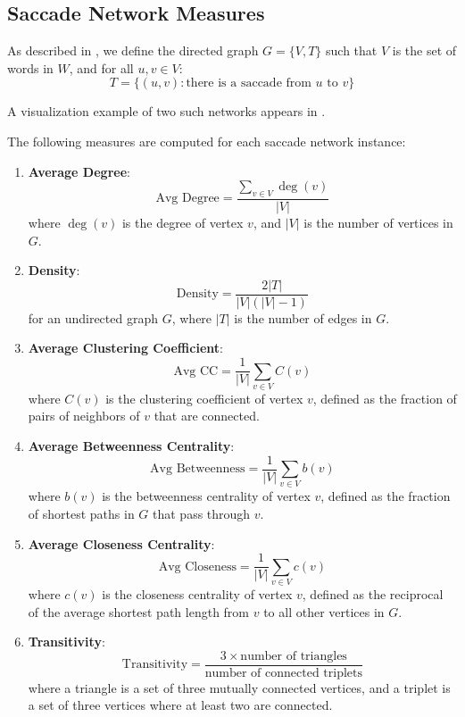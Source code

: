 \subsection{Saccade Network Measures}
\label{app:network_measures}


As described in , we define the directed graph $G=\{V,T\}$ such that $V$ is the set of words in $W$, and for all $u,v\in V$:
 $$T=\{\left(u,v\right): \text{there is a saccade from }u \text{ to }v\}$$ 

A visualization example of two such networks appears in .
 
 The following measures are computed for each saccade network instance:
\begin{enumerate}
    \item \textbf{Average Degree}:
    \[
    \text{Avg Degree} = \frac{\sum_{v \in V} \deg(v)}{|V|}
    \]
    where \( \deg(v) \) is the degree of vertex \( v \), and \( |V| \) is the number of vertices in \( G \).

    \item \textbf{Density}:
    \[
    \text{Density} = \frac{2|T|}{|V|(|V| - 1)}
    \]
    for an undirected graph \( G \), where \( |T| \) is the number of edges in \( G \).

    \item \textbf{Average Clustering Coefficient}:
    \[
    \text{Avg CC} = \frac{1}{|V|} \sum_{v \in V} C(v)
    \]
    where \( C(v) \) is the clustering coefficient of vertex \( v \), defined as the fraction of pairs of neighbors of \( v \) that are connected.

    \item \textbf{Average Betweenness Centrality}:
    \[
    \text{Avg Betweenness} = \frac{1}{|V|} \sum_{v \in V} b(v)
    \]
    where \( b(v) \) is the betweenness centrality of vertex \( v \), defined as the fraction of shortest paths in \( G \) that pass through \( v \).

    \item \textbf{Average Closeness Centrality}:
    \[
    \text{Avg Closeness} = \frac{1}{|V|} \sum_{v \in V} c(v)
    \]
    where \( c(v) \) is the closeness centrality of vertex \( v \), defined as the reciprocal of the average shortest path length from \( v \) to all other vertices in \( G \).

    \item \textbf{Transitivity}:
    \[
    \text{Transitivity} = \frac{3 \times \text{number of triangles}}{\text{number of connected triplets}}
    \]
    where a triangle is a set of three mutually connected vertices, and a triplet is a set of three vertices where at least two are connected.


\end{enumerate}
